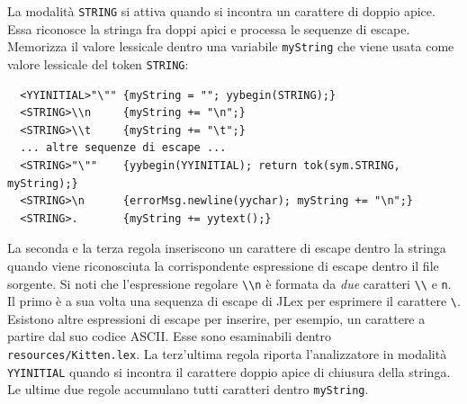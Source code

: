 La modalit\`a \texttt{STRING} si attiva quando si incontra
un carattere di doppio apice. Essa riconosce la stringa fra doppi apici e
processa le sequenze di escape. Memorizza il valore lessicale dentro una
variabile \texttt{myString} che viene usata come valore lessicale del
token \texttt{STRING}:
%
\begin{verbatim}
  <YYINITIAL>"\"" {myString = ""; yybegin(STRING);}
  <STRING>\\n     {myString += "\n";}
  <STRING>\\t     {myString += "\t";}
  ... altre sequenze di escape ...
  <STRING>"\""    {yybegin(YYINITIAL); return tok(sym.STRING, myString);}
  <STRING>\n      {errorMsg.newline(yychar); myString += "\n";}
  <STRING>.       {myString += yytext();}
\end{verbatim}
%
La seconda e la terza regola inseriscono un carattere di escape
dentro la stringa quando viene riconosciuta la corrispondente
espressione di escape dentro il file sorgente. Si noti che l'espressione
regolare \verb!\\n! \`e formata da \emph{due} caratteri \verb!\\! e \texttt{n}.
Il primo \`e a sua volta una sequenza di escape di JLex per
esprimere il carattere \verb!\!. Esistono altre espressioni di escape
per inserire, per esempio, un carattere a partire dal suo codice ASCII.
Esse sono esaminabili dentro \texttt{resources/Kitten.lex}.
La terz'ultima regola riporta l'analizzatore in modalit\`a \texttt{YYINITIAL}
quando si incontra il carattere doppio apice di chiusura della stringa.
Le ultime due regole accumulano tutti caratteri dentro \texttt{myString}.
%
%
